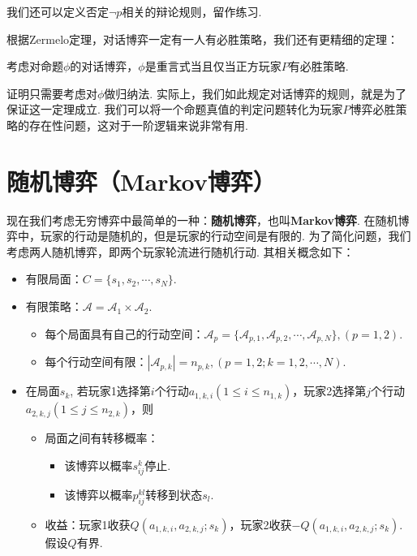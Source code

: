 我们还可以定义否定$\neg p$相关的辩论规则，留作练习. 

根据Zermelo定理，对话博弈一定有一人有必胜策略，我们还有更精细的定理：
\begin{theorem}\label{theorem:dialogue-game}
考虑对命题$\phi$的对话博弈，$\phi$是重言式当且仅当正方玩家$P$有必胜策略.
\end{theorem}

证明只需要考虑对$\phi$做归纳法. 实际上，我们如此规定对话博弈的规则，就是为了保证这一定理成立. 我们可以将一个命题真值的判定问题转化为玩家$P$博弈必胜策略的存在性问题，这对于一阶逻辑来说非常有用.


\section{随机博弈（Markov博弈）} %
现在我们考虑无穷博弈中最简单的一种：\textbf{随机博弈}，也叫\textbf{Markov博弈}. 在随机博弈中，玩家的行动是随机的，但是玩家的行动空间是有限的. 为了简化问题，我们考虑两人随机博弈，即两个玩家轮流进行随机行动. 其相关概念如下：
\begin{itemize}
    \item 有限局面：$C=\{s_1,s_2,\cdots,s_N\}$.
    \item 有限策略：$\mathcal A=\mathcal A_1\times \mathcal A_2.$
    \begin{itemize}
        \item 每个局面具有自己的行动空间：$\mathcal A_p = \{\mathcal A_{p,1},\mathcal A_{p,2},\cdots, \mathcal A_{p,N}\}, (p=1,2)$.
        \item 每个行动空间有限：$|\mathcal A_{p,k}|=n_{p,k},(p=1,2;k=1,2,\cdots,N)$.
    \end{itemize}
    \item 在局面$s_k$, 若玩家1选择第$i$个行动$a_{1,k,i}(1\le i\le n_{1,k})$，玩家2选择第$j$个行动$a_{2,k,j}(1\le j\le n_{2,k})$，则
    
    \begin{itemize}
        \item 局面之间有转移概率：
        \begin{itemize}
            \item 该博弈以概率$s_{ij}^k$停止.
            \item 该博弈以概率$p_{ij}^{kl}$转移到状态$s_l$.
        \end{itemize}
        \item 收益：玩家1收获$Q(a_{1,k,i},a_{2,k,j};s_k)$，玩家2收获$-Q(a_{1,k,i},a_{2,k,j};s_k)$. 假设$Q$有界.
    \end{itemize}
\end{itemize}

